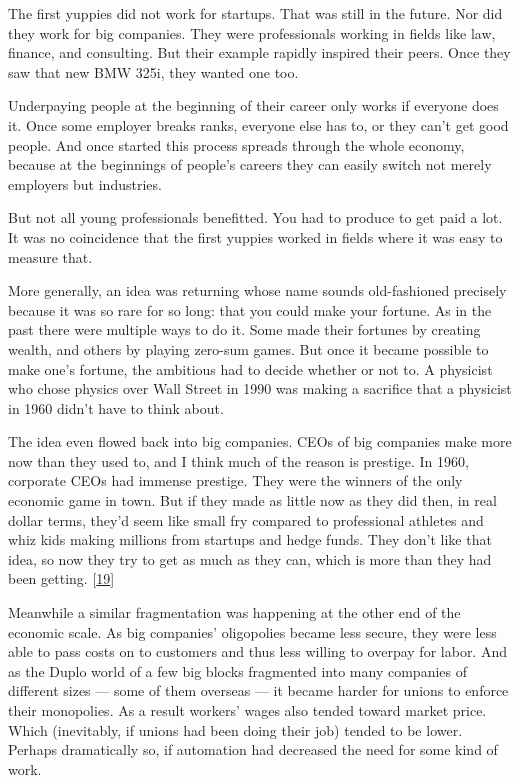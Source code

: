 The first yuppies did not work for startups. That was still in the
future. Nor did they work for big companies. They were professionals
working in fields like law, finance, and consulting. But their example
rapidly inspired their peers. Once they saw that new BMW 325i, they
wanted one too.

Underpaying people at the beginning of their career only works if
everyone does it. Once some employer breaks ranks, everyone else has to,
or they can't get good people. And once started this process spreads
through the whole economy, because at the beginnings of people's careers
they can easily switch not merely employers but industries.

But not all young professionals benefitted. You had to produce to get
paid a lot. It was no coincidence that the first yuppies worked in
fields where it was easy to measure that.

More generally, an idea was returning whose name sounds old-fashioned
precisely because it was so rare for so long: that you could make your
fortune. As in the past there were multiple ways to do it. Some made
their fortunes by creating wealth, and others by playing zero-sum games.
But once it became possible to make one's fortune, the ambitious had to
decide whether or not to. A physicist who chose physics over Wall Street
in 1990 was making a sacrifice that a physicist in 1960 didn't have to
think about.

The idea even flowed back into big companies. CEOs of big companies make
more now than they used to, and I think much of the reason is prestige.
In 1960, corporate CEOs had immense prestige. They were the winners of
the only economic game in town. But if they made as little now as they
did then, in real dollar terms, they'd seem like small fry compared to
professional athletes and whiz kids making millions from startups and
hedge funds. They don't like that idea, so now they try to get as much
as they can, which is more than they had been getting.
{[}\hyperref[f19n]{19}{]}

Meanwhile a similar fragmentation was happening at the other end of the
economic scale. As big companies' oligopolies became less secure, they
were less able to pass costs on to customers and thus less willing to
overpay for labor. And as the Duplo world of a few big blocks fragmented
into many companies of different sizes --- some of them overseas --- it
became harder for unions to enforce their monopolies. As a result
workers' wages also tended toward market price. Which (inevitably, if
unions had been doing their job) tended to be lower. Perhaps
dramatically so, if automation had decreased the need for some kind of
work.

